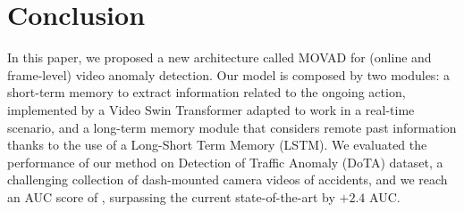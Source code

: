 \section{Conclusion}
\label{sec:conclusions}

In this paper, we proposed a new architecture called MOVAD for (online and frame-level) video anomaly detection.
Our model is composed by two modules: a short-term memory to extract information related to the ongoing action, implemented by a Video Swin Transformer adapted to work in a real-time scenario, and a long-term memory module that considers remote past information thanks to the use of a Long-Short Term Memory (LSTM).
We evaluated the performance of our method on Detection of Traffic Anomaly (DoTA) dataset, a challenging collection of dash-mounted camera videos of accidents, and we reach an AUC score of , surpassing the current state-of-the-art by $+2.4$ AUC.